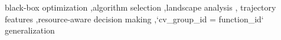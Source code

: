 \documentclass[a4paper,fleqn]{cas-dc}
\begin{document}
\begin{keywords}
black-box optimization \sep algorithm selection \sep landscape analysis \sep
trajectory features \sep resource-aware decision making \sep `cv_group_id = function_id`
generalization
\end{keywords}

\maketitle













\end{document}
